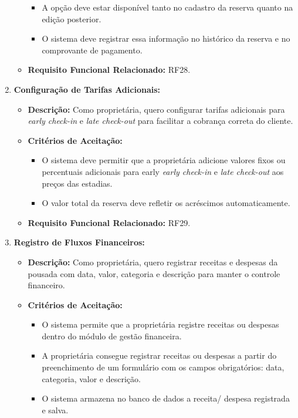 \documentclass[
	12pt,				%
	openany,			%
	twoside,			%
	a4paper,			%
	english,			%
	french,				%
	spanish,			%
	brazil				%
	]{abntex2}
\begin{document}
\begin{enumerate}[label=\textbf{\arabic*.}]
\begin{itemize}
\begin{itemize}
	 		\item A opção deve estar disponível tanto no cadastro da reserva quanto na edição posterior.
	 		\item O sistema deve registrar essa informação no histórico da reserva e no comprovante de pagamento.
	 	\end{itemize}
	 	\item \textbf{Requisito Funcional Relacionado:} RF28.
	 \end{itemize} 
	  \item \textbf{Configuração de Tarifas Adicionais:}
	 \begin{itemize}
	 	\item \textbf{Descrição:} Como proprietária, quero configurar tarifas adicionais para \textit{early check-in} e \textit{late check-out} para facilitar a cobrança correta do cliente.
	 	\item \textbf{Critérios de Aceitação:}
	 	\begin{itemize}
	 		\item O sistema deve permitir que a proprietária adicione valores fixos ou percentuais adicionais para early \textit{early check-in} e \textit{late check-out} aos preços das estadias.
	 		\item O valor total da reserva deve refletir os acréscimos automaticamente.
	 	\end{itemize}
	 	\item \textbf{Requisito Funcional Relacionado:} RF29.
	 \end{itemize} 
	  \item \textbf{Registro de Fluxos Financeiros:}
	 \begin{itemize}
	 	\item \textbf{Descrição:} Como proprietária, quero registrar receitas e despesas da pousada com data, valor, categoria e descrição para manter o controle financeiro. 
	 	\item \textbf{Critérios de Aceitação:}
	 	\begin{itemize}
	 		\item O sistema permite que a proprietária registre receitas ou despesas dentro do módulo de gestão financeira.
	 		\item A proprietária consegue registrar receitas ou despesas a partir do preenchimento de um formulário com os campos obrigatórios: data, categoria, valor e descrição.
	 		\item O sistema armazena no banco de dados a receita/ despesa registrada e salva.
	 	\end{itemize}

\end{itemize}
\end{enumerate}
\end{document}
